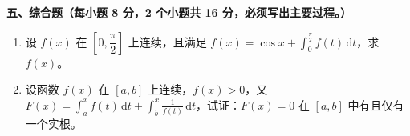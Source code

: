 \documentclass[a4paper,11pt]{ctexart}
\newcommand{\dd}{\,\mathrm{d}}
\begin{document}
\vspace{1.0em}

\textbf{五、综合题（每小题 8 分，2 个小题共 16 分，必须写出主要过程。）}

\begin{enumerate}[label=\arabic*., start=15, leftmargin=2em, itemsep=1.0em, topsep=0.6em]
  \item 设 $f(x)$ 在 $\left[0,\dfrac{\pi}{2}\right]$ 上连续，且满足 $f(x)=\cos x+\displaystyle\int_0^{\frac{\pi}{2}}f(t)\dd t$，求 $f(x)$。

  \item 设函数 $f(x)$ 在 $[a,b]$ 上连续，$f(x)>0$，又 $F(x)=\displaystyle\int_a^x f(t)\dd t+\int_b^x \frac{1}{f(t)}\dd t$，试证：$F(x)=0$ 在 $[a,b]$ 中有且仅有一个实根。
\end{enumerate}
\end{document}
